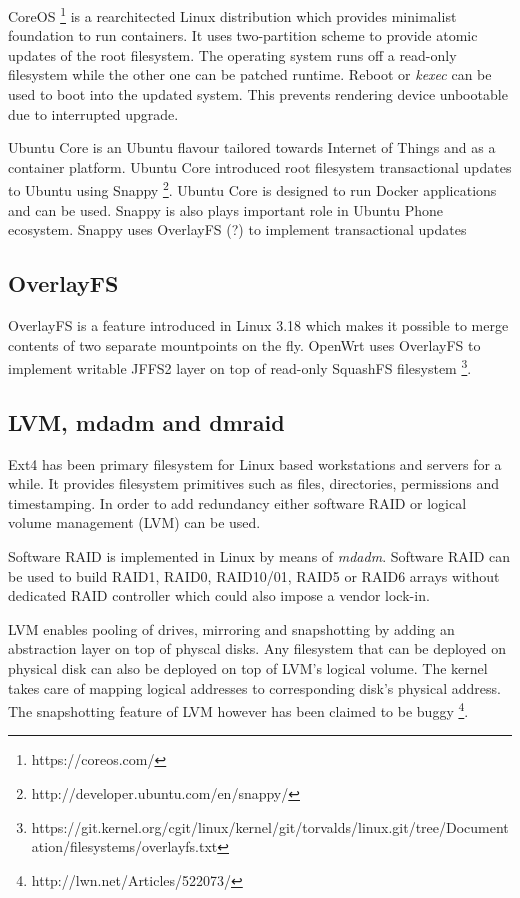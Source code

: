 \documentclass{article}
\begin{document}
CoreOS \footnote{https://coreos.com/} is a rearchitected Linux distribution
which provides minimalist foundation to run containers.
It uses two-partition scheme to provide atomic updates of the root filesystem.
The operating system runs off a read-only filesystem while the other one
can be patched runtime. Reboot or \emph{kexec} can be used to boot into
the updated system.
This prevents rendering device unbootable due to interrupted upgrade.

Ubuntu Core is an Ubuntu flavour tailored towards Internet of Things and as a
container platform.
Ubuntu Core introduced root filesystem transactional
updates to Ubuntu using Snappy
\footnote{http://developer.ubuntu.com/en/snappy/}.
Ubuntu Core is designed to run Docker applications and can be used.
Snappy is also plays important role in Ubuntu Phone ecosystem.
Snappy uses OverlayFS (?) to implement transactional updates 


\subsection{OverlayFS}

OverlayFS is a feature introduced in Linux 3.18 which makes it possible to merge contents of two separate mountpoints on the fly.
OpenWrt uses OverlayFS to implement writable JFFS2 layer on top of read-only SquashFS filesystem
\footnote{https://git.kernel.org/cgit/linux/kernel/git/torvalds/linux.git/tree/Documentation/filesystems/overlayfs.txt}.

\subsection{LVM, mdadm and dmraid}

Ext4 has been primary filesystem for Linux based workstations and servers for
a while. It provides filesystem primitives such as files, directories,
permissions and timestamping. In order to add redundancy either software RAID
or logical volume management (LVM) can be used.

Software RAID is implemented in Linux by means of \emph{mdadm}. Software RAID
can be used to build RAID1, RAID0, RAID10/01, RAID5 or RAID6 arrays without
dedicated RAID controller which could also impose a vendor lock-in.

LVM enables pooling of drives, mirroring and snapshotting by adding an
abstraction layer on top of physcal disks. Any filesystem that can be deployed
on physical disk can also be deployed on top of LVM's logical volume. The
kernel takes care of mapping logical addresses to corresponding disk's physical
address. The snapshotting feature of LVM however has been claimed to be buggy
\footnote{http://lwn.net/Articles/522073/}.
\end{document}
